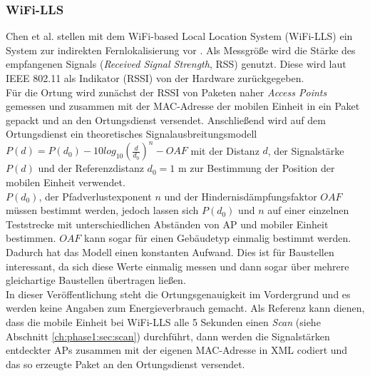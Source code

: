 \subsubsection{WiFi-LLS}
\label{ch:Vorherige:sec:LLS}
Chen et al. stellen mit dem WiFi-based Local Location System (WiFi-LLS) ein System zur indirekten Fernlokalisierung vor \cite{chen2007design}.
Als Messgröße wird die Stärke des empfangenen Signals (\emph{Received Signal Strength}, RSS) genutzt. 
Diese wird laut IEEE 802.11 als Indikator (RSSI) von der Hardware zurückgegeben. \\
Für die Ortung wird zunächst der RSSI von Paketen naher \emph{Access Points} gemessen und zusammen mit der MAC-Adresse der mobilen Einheit in ein Paket gepackt und an den Ortungsdienst versendet.
Anschließend wird auf dem Ortungsdienst ein theoretisches Signalausbreitungsmodell $P(d) = P(d_0) - 10log_{10}(\frac{d}{d_0})^n - OAF$ mit der Distanz $d$, der Signalstärke $P(d)$ und der Referenzdistanz $d_0 = 1$ m zur Bestimmung der Position der mobilen Einheit verwendet. \\
$P(d_0)$, der Pfadverlustexponent $n$ und der Hindernisdämpfungsfaktor $OAF$ müssen bestimmt werden, jedoch lassen sich $P(d_0)$ und $n$ auf einer einzelnen Teststrecke mit unterschiedlichen Abständen von AP und mobiler Einheit bestimmen. $OAF$ kann sogar für einen Gebäudetyp einmalig bestimmt werden.
Dadurch hat das Modell einen konstanten Aufwand. 
Dies ist für Baustellen interessant, da sich diese Werte einmalig messen und dann sogar über mehrere gleichartige Baustellen übertragen ließen.\\
In dieser Veröffentlichung steht die Ortungsgenauigkeit im Vordergrund und es werden keine Angaben zum Energieverbrauch gemacht. 
Als Referenz kann dienen, dass die mobile Einheit bei WiFi-LLS alle 5 Sekunden einen \emph{Scan} (siehe Abschnitt \ref{ch:phase1:sec:scan}) durchführt, dann werden die Signalstärken entdeckter APs zusammen mit der eigenen MAC-Adresse in XML codiert und das so erzeugte Paket an den Ortungsdienst versendet.

